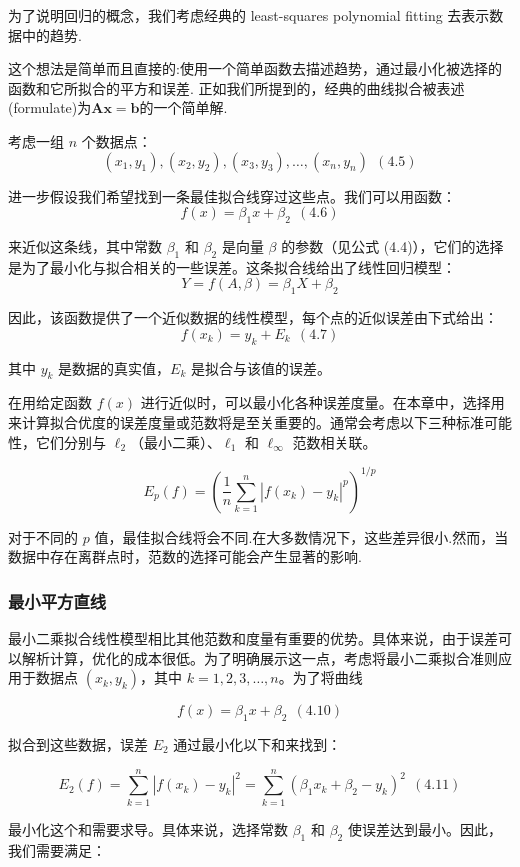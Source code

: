 \documentclass{ctexart}
\begin{document}
为了说明回归的概念，我们考虑经典的 least-squares polynomial fitting 去表示数据中的趋势.

这个想法是简单而且直接的:使用一个简单函数去描述趋势，通过最小化被选择的函数和它所拟合的平方和误差.
正如我们所提到的，经典的曲线拟合被表述(formulate)为$\mathbf{Ax=b}$的一个简单解.

考虑一组 \( n \) 个数据点：
\[ (x_1, y_1), (x_2, y_2), (x_3, y_3), \ldots, (x_n, y_n) \ \ (4.5) \]

进一步假设我们希望找到一条最佳拟合线穿过这些点。我们可以用函数：
\[ f(x) = \beta_1 x + \beta_2 \ \ (4.6) \]

来近似这条线，其中常数 \(\beta_1\) 和 \(\beta_2\) 是向量 \(\beta\) 的参数（见公式 (4.4)），它们的选择是为了最小化与拟合相关的一些误差。这条拟合线给出了线性回归模型：
\[ Y = f(A, \beta) = \beta_1 X + \beta_2 \]

因此，该函数提供了一个近似数据的线性模型，每个点的近似误差由下式给出：
\[ f(x_k) = y_k + E_k \ \ (4.7) \]

其中 \( y_k \) 是数据的真实值，\( E_k \) 是拟合与该值的误差。


在用给定函数 \( f(x) \) 进行近似时，可以最小化各种误差度量。在本章中，选择用来计算拟合优度的误差度量或范数将是至关重要的。通常会考虑以下三种标准可能性，它们分别与 \( \ell_2 \)（最小二乘）、\( \ell_1 \) 和 \( \ell_\infty \) 范数相关联。

\[ E_p(f) = \left( \frac{1}{n} \sum_{k=1}^{n} |f(x_k) - y_k|^p \right)^{1/p} \]

对于不同的 \( p \) 值，最佳拟合线将会不同.在大多数情况下，这些差异很小.然而，当数据中存在离群点时，范数的选择可能会产生显著的影响.


\subsubsection*{最小平方直线}
最小二乘拟合线性模型相比其他范数和度量有重要的优势。具体来说，由于误差可以解析计算，优化的成本很低。为了明确展示这一点，考虑将最小二乘拟合准则应用于数据点 \((x_k, y_k)\)，其中 \(k = 1, 2, 3, \ldots, n\)。为了将曲线

\[ f(x) = \beta_1 x + \beta_2 \ \ (4.10) \]

拟合到这些数据，误差 \(E_2\) 通过最小化以下和来找到：

\[ E_2(f) = \sum_{k=1}^{n} |f(x_k) - y_k|^2 = \sum_{k=1}^{n} (\beta_1 x_k + \beta_2 - y_k)^2 \ \ (4.11) \]

最小化这个和需要求导。具体来说，选择常数 \(\beta_1\) 和 \(\beta_2\) 使误差达到最小。因此，我们需要满足：
\end{document}
